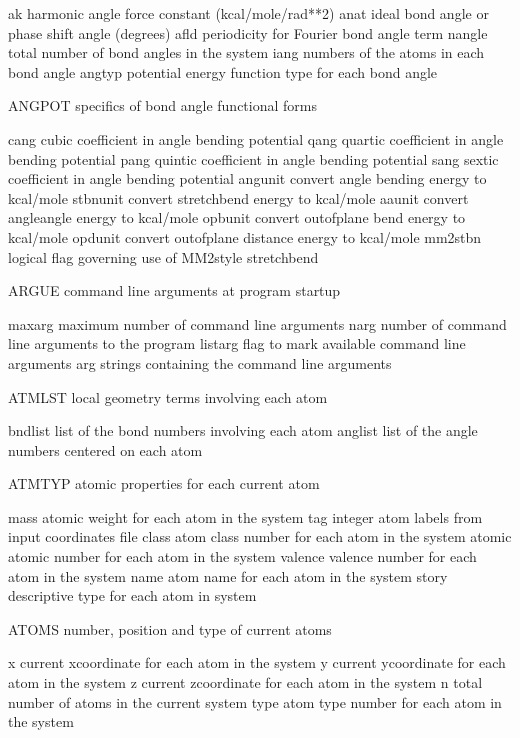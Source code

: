 \documentclass[letterpaper,11pt,english]{sphinxmanual}
\begin{document}
ak      harmonic angle force constant (kcal/mole/rad**2)
anat    ideal bond angle or phase shift angle (degrees)
afld    periodicity for Fourier bond angle term
nangle  total number of bond angles in the system
iang    numbers of the atoms in each bond angle
angtyp  potential energy function type for each bond angle

ANGPOT  specifics of bond angle functional forms

cang    cubic coefficient in angle bending potential
qang    quartic coefficient in angle bending potential
pang    quintic coefficient in angle bending potential
sang    sextic coefficient in angle bending potential
angunit convert angle bending energy to kcal/mole
stbnunit        convert stretch\sphinxhyphen{}bend energy to kcal/mole
aaunit  convert angle\sphinxhyphen{}angle energy to kcal/mole
opbunit convert out\sphinxhyphen{}of\sphinxhyphen{}plane bend energy to kcal/mole
opdunit convert out\sphinxhyphen{}of\sphinxhyphen{}plane distance energy to kcal/mole
mm2stbn logical flag governing use of MM2\sphinxhyphen{}style stretch\sphinxhyphen{}bend

ARGUE   command line arguments at program startup

maxarg  maximum number of command line arguments
narg    number of command line arguments to the program
listarg flag to mark available command line arguments
arg     strings containing the command line arguments

ATMLST  local geometry terms involving each atom

bndlist list of the bond numbers involving each atom
anglist list of the angle numbers centered on each atom

ATMTYP  atomic properties for each current atom

mass    atomic weight for each atom in the system
tag     integer atom labels from input coordinates file
class   atom class number for each atom in the system
atomic  atomic number for each atom in the system
valence valence number for each atom in the system
name    atom name for each atom in the system
story   descriptive type for each atom in system

ATOMS   number, position and type of current atoms

x       current x\sphinxhyphen{}coordinate for each atom in the system
y       current y\sphinxhyphen{}coordinate for each atom in the system
z       current z\sphinxhyphen{}coordinate for each atom in the system
n       total number of atoms in the current system
type    atom type number for each atom in the system
\end{document}
